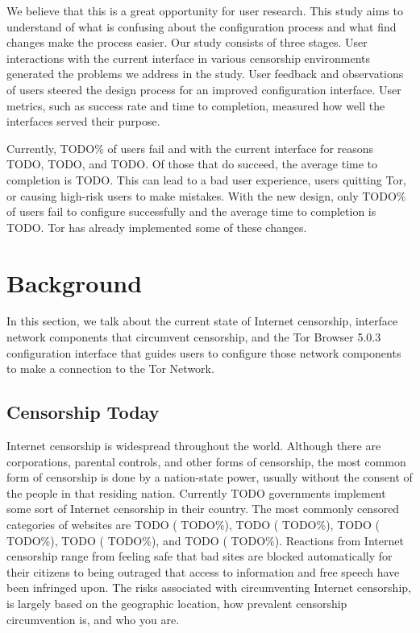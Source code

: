\documentclass[USenglish,oneside,twocolumn]{article}
\begin{document}
We believe that this is a great opportunity for user research. This study aims to understand of what is confusing about the configuration process and what find changes make the process easier. Our study consists of three stages. User interactions with the current interface in various censorship environments generated the problems we address in the study. User feedback and observations of users steered the design process for an improved configuration interface. User metrics, such as success rate and time to completion, measured how well the interfaces served their purpose.  

Currently, {\color {red} TODO}\% of users fail and with the current interface for reasons {\color {red} TODO}, {\color {red} TODO}, and {\color {red} TODO}. Of those that do succeed, the average time to completion is {\color {red} TODO}. This can lead to a bad user experience, users quitting Tor, or causing high-risk users to make mistakes. With the new design, only {\color {red} TODO}\% of users fail to configure successfully and the average time to completion is {\color {red} TODO}. Tor has already implemented some of these changes.


\section{Background} 
In this section, we talk about the current state of Internet censorship, interface network components that circumvent censorship, and the Tor Browser 5.0.3 configuration interface that guides users to configure those network components to make a connection to the Tor Network. 

\subsection{Censorship Today} 
Internet censorship is widespread throughout the world. Although there are corporations, parental controls, and other forms of censorship, the most common form of censorship is done by a nation-state power, usually without the consent of the people in that residing nation. Currently {\color {red} TODO} governments implement some sort of Internet censorship in their country. The most commonly censored categories of websites are {\color {red} TODO} ({\color {red} TODO}\%), {\color {red} TODO} ({\color {red} TODO}\%), {\color {red} TODO} ({\color {red} TODO}\%), {\color {red} TODO} ({\color {red} TODO}\%), and {\color {red} TODO} ({\color {red} TODO}\%).  Reactions from Internet censorship range from feeling safe that bad sites are blocked automatically for their citizens to being outraged that access to information and free speech have been infringed upon. The risks associated with circumventing Internet censorship, is largely based on the geographic location, how prevalent censorship circumvention is, and who you are. 
\end{document}
